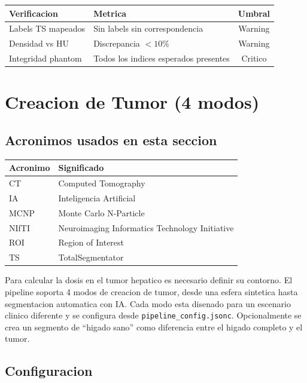 \documentclass[12pt,a4paper]{article}
\begin{document}
\begin{table}[H]
\centering
\begin{tabular}{llc}
\toprule
\textbf{Verificacion} & \textbf{Metrica} & \textbf{Umbral} \\
\midrule
Labels TS mapeados & Sin labels sin correspondencia & Warning \\
Densidad vs HU & Discrepancia $< 10\%$ & Warning \\
Integridad phantom & Todos los indices esperados presentes & Critico \\
\bottomrule
\end{tabular}
\end{table}

\newpage

\section{Creacion de Tumor (4 modos)}
\label{sec:tumor}

\subsection*{Acronimos usados en esta seccion}
\begin{tabular}{ll}
\toprule
\textbf{Acronimo} & \textbf{Significado} \\
\midrule
CT & Computed Tomography \\
IA & Inteligencia Artificial \\
MCNP & Monte Carlo N-Particle \\
NIfTI & Neuroimaging Informatics Technology Initiative \\
ROI & Region of Interest \\
TS & TotalSegmentator \\
\bottomrule
\end{tabular}

Para calcular la dosis en el tumor hepatico es necesario definir su contorno. El pipeline soporta
4 modos de creacion de tumor, desde una esfera sintetica hasta segmentacion automatica con IA.
Cada modo esta disenado para un escenario clinico diferente y se configura desde
\texttt{pipeline\_config.jsonc}. Opcionalmente se crea un segmento de ``higado sano'' como
diferencia entre el higado completo y el tumor.

\subsection{Configuracion}
\end{document}
